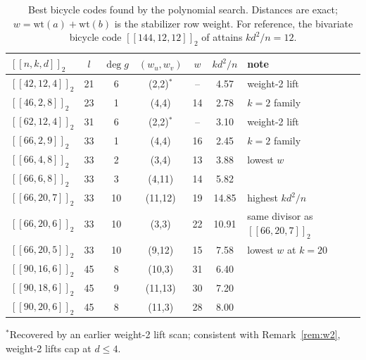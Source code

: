 \documentclass[journal,onecolumn]{IEEEtran}
\theoremstyle{definition}
\theoremstyle{remark}
\newcommand{\wt}{\mathrm{wt}}
\begin{document}
\begin{table}[t]
\centering
\caption{Best bicycle codes found by the polynomial search. Distances
are exact; $w=\wt(a)+\wt(b)$ is the stabilizer row weight. For reference,
the bivariate bicycle code $[[144,12,12]]_2$ of \cite{BB24} attains
$kd^2/n=12$.}
\label{tab:codes}
\renewcommand{\arraystretch}{1.2}
\begin{tabular}{@{}lcccccll@{}}
\toprule
$[[n,k,d]]_2$ & $l$ & $\deg g$ & $(w_u,w_v)$ & $w$ & $kd^2/n$ & note \\
\midrule
$[[42,12,4]]_2$ & 21 & 6  & (2,2)$^{*}$ & --  & 4.57 & weight-2 lift \\
$[[46,2,8]]_2$  & 23 & 1  & (4,4) & 14  & 2.78 & $k=2$ family \\
$[[62,12,4]]_2$ & 31 & 6  & (2,2)$^{*}$ & --  & 3.10 & weight-2 lift \\
$[[66,2,9]]_2$  & 33 & 1  & (4,4) & 16  & 2.45 & $k=2$ family \\
$[[66,4,8]]_2$  & 33 & 2  & (3,4) & 13  & 3.88 & lowest $w$ \\
$[[66,6,8]]_2$  & 33 & 3  & (4,11) & 14  & 5.82 & \\
$[[66,20,7]]_2$ & 33 & 10 & (11,12) & 19  & 14.85 & highest $kd^2/n$ \\
$[[66,20,6]]_2$ & 33 & 10 & (3,3) & 22  & 10.91 & same divisor as $[[66,20,7]]_2$ \\
$[[66,20,5]]_2$ & 33 & 10 & (9,12) & 15  & 7.58 & lowest $w$ at $k=20$ \\
$[[90,16,6]]_2$ & 45 & 8  & (10,3) & 31  & 6.40 & \\
$[[90,18,6]]_2$ & 45 & 9  & (11,13) & 30  & 7.20 & \\
$[[90,20,6]]_2$ & 45 & 8  & (11,3) & 28  & 8.00 & \\
\bottomrule
\end{tabular}

\vspace{2pt}
{\footnotesize $^{*}$Recovered by an earlier weight-2 lift scan; consistent
with Remark~\ref{rem:w2}, weight-2 lifts cap at $d\le4$.}
\end{table}
\end{document}
